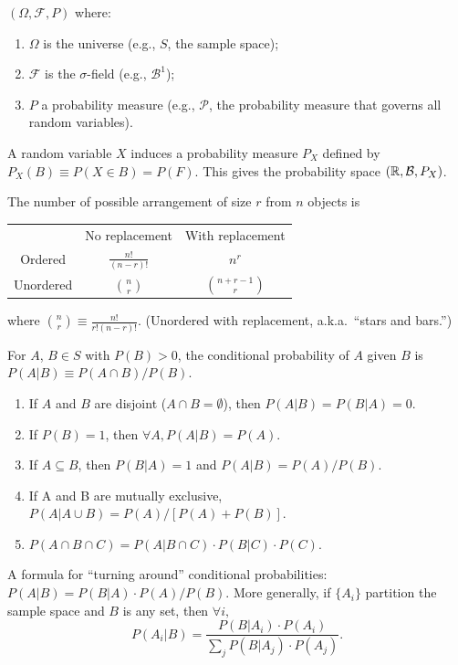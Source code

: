 \documentclass[8pt,letterpaper, landscape]{extarticle} %
\newcommand{\B}{\ensuremath{\mathcal{B}}}
\begin{document}
\begin{multicols}{3}
\begin{description}
 $ (\Omega, \mathcal{F}, P) $ where:
\begin{enumerate}
\item $ \Omega $ is the universe (e.g., $ S $, the sample space);
\item $ \mathcal{F} $ is the $ \sigma $-field (e.g., $ \B^1 $);
\item $ P $ a probability measure (e.g., $ \mathcal{P} $, the probability measure that governs all random variables).
\end{enumerate}
A random variable $ X $ induces a probability measure $ P_X $ defined by $ P_X (B) \equiv P(X \in B) = P(F) $. This gives the probability space $ (\R, \B, P_X) $.

 The number of possible arrangement of size $ r $ from $ n $ objects is
\begin{center}
\begin{tabular}{ccc}
\hline
 & No replacement & With replacement \\ 
Ordered & $ \frac{n!}{(n-r)!} $ & $ n^r $ \\ 
Unordered & $ \binom{n}{r} $ & $ \binom{n+r-1}{r} $  \\ 
\hline
\end{tabular} 
\end{center}
where $ \binom{n}{r} \equiv \frac{n!}{r! (n-r)!} $. (Unordered with replacement, a.k.a.\ ``stars and bars.'')

 For $ A $, $ B \in S $ with $ P(B) > 0 $, the conditional probability of $ A $ given $ B $ is $ P(A|B) \equiv P(A \cap B) / P(B) $.
\begin{enumerate}
\item If $ A $ and $ B $ are disjoint ($ A \cap B = \emptyset $), then $ P(A|B) = P(B|A) = 0 $.
\item If $ P(B) = 1 $, then $ \forall A, P(A|B) = P(A) $.
\item If $ A \subseteq B $, then $ P(B|A) = 1 $ and $ P(A|B) = P(A)/P(B) $.
\item If A and B are mutually exclusive, $ P(A|A \cup B) = P(A) / [P(A) + P(B)] $.
\item $ P (A \cap B \cap C) = P(A|B \cap C) \cdot P(B|C) \cdot P(C) $.
\end{enumerate}

 A formula for ``turning around'' conditional probabilities: $ P (A|B) = P(B|A) \cdot P(A) / P(B) $. More generally, if $ \{ A_i \} $ partition the sample space and $ B $ is any set, then $ \forall i, $ $$ P(A_i | B) = \frac{P(B|A_i) \cdot P(A_i)}{\sum_j P(B|A_j) \cdot P(A_j)}. $$


\end{description}
\end{multicols}
\end{document}
